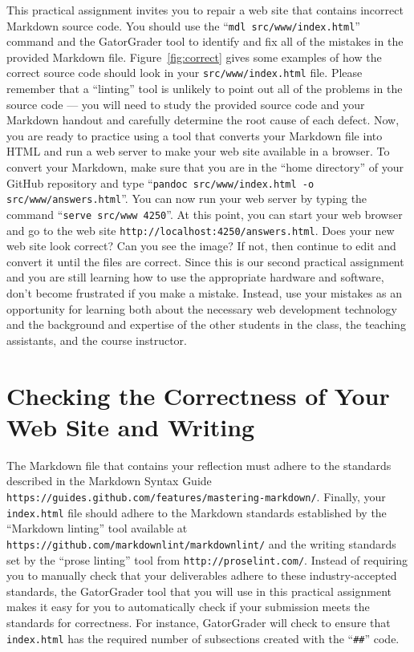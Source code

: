 \documentclass[11pt]{article}
\newcommand{\mainprogram}{\lstinline{index.html}}
\newcommand{\mainprogramsource}{\lstinline{src/www/index.html}}
\newcommand{\command}[1]{``\lstinline{#1}''}
\newcommand{\url}[1]{\lstinline{#1}}
\newcommand{\step}[1]{``{#1}''}
\begin{document}
This practical assignment invites you to repair a web site that contains
incorrect Markdown source code. You should use the \command{mdl
src/www/index.html} command and the GatorGrader tool to identify and fix all of
the mistakes in the provided Markdown file. Figure~\ref{fig:correct} gives some
examples of how the correct source code should look in your \mainprogramsource{}
file. Please remember that a ``linting'' tool is unlikely to point out all of
the problems in the source code --- you will need to study the provided source
code and your Markdown handout and carefully determine the root cause of each
defect. Now, you are ready to practice using a tool that converts your Markdown
file into HTML and run a web server to make your web site available in a
browser. To convert your Markdown, make sure that you are in the ``home
directory'' of your GitHub repository and type \command{pandoc
src/www/index.html -o src/www/answers.html}. You can now run your web server by
typing the command \command{serve src/www 4250}. At this point, you can start
your web browser and go to the web site
\url{http://localhost:4250/answers.html}. Does your new web site look correct?
Can you see the image? If not, then continue to edit and convert it until the
files are correct. Since this is our second practical assignment and you are
still learning how to use the appropriate hardware and software, don't become
frustrated if you make a mistake. Instead, use your mistakes as an opportunity
for learning both about the necessary web development technology and the
background and expertise of the other students in the class, the teaching
assistants, and the course instructor.

\section*{Checking the Correctness of Your Web Site and Writing}

The Markdown file that contains your reflection must adhere to the standards
described in the Markdown Syntax Guide
\url{https://guides.github.com/features/mastering-markdown/}. Finally, your
\mainprogram{} file should adhere to the Markdown standards established by the
\step{Markdown linting} tool available at
\url{https://github.com/markdownlint/markdownlint/} and the writing standards
set by the \step{prose linting} tool from \url{http://proselint.com/}. Instead
of requiring you to manually check that your deliverables adhere to these
industry-accepted standards, the GatorGrader tool that you will use in this
practical assignment makes it easy for you to automatically check if your
submission meets the standards for correctness. For instance, GatorGrader will
check to ensure that \mainprogram{} has the required number of subsections
created with the \command{##} code.
\end{document}

